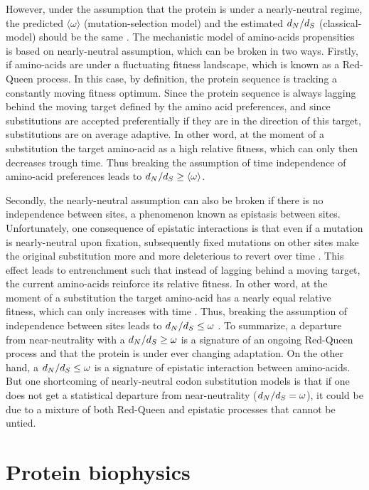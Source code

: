 However, under the assumption that the protein is under a nearly-neutral regime, the predicted $\langle \omega \rangle$ (mutation-selection model)  and the estimated $d_N / d_S$ (classical-model) should be the same \citep{Spielman2015, Spielman2016}.
The mechanistic model of amino-acids propensities is based on nearly-neutral assumption, which can be broken in two ways.
Firstly, if amino-acids are under a fluctuating fitness landscape, which is known as a Red-Queen process.
In this case, by definition, the protein sequence is tracking a constantly moving fitness optimum.
Since the protein sequence is always lagging behind the moving target defined by the amino acid preferences, and since substitutions are accepted preferentially if they are in the direction of this target, substitutions are on average adaptive.
In other word, at the moment of a substitution the target amino-acid as a high relative fitness, which can only then decreases trough time.
Thus breaking the assumption of time independence of amino-acid preferences leads to $d_N / d_S \geq \langle \omega \rangle$.

Secondly, the nearly-neutral assumption can also be broken if there is no independence between sites, a phenomenon known as epistasis between sites.
Unfortunately, one consequence of epistatic interactions is that even if a mutation is nearly-neutral upon fixation, subsequently fixed mutations on other sites make the original substitution more and more deleterious to revert over time \citep{Gong2014, Lunzer2010, Mccandlish2013}.
This effect leads to entrenchment such that instead of lagging behind a moving target, the current amino-acids reinforce its relative fitness.
In other word, at the moment of a substitution the target amino-acid has a nearly equal relative fitness, which can only increases with time \cite{Goldstein2016, Goldstein2017}.
Thus, breaking the assumption of independence between sites leads to $d_N / d_S \leq \omega$ \citep{Rodrigue2016}.
To summarize, a departure from near-neutrality with a $d_N / d_S \geq \omega$ is a signature of an ongoing Red-Queen process and that the protein is under ever changing adaptation.
On the other hand, a $d_N / d_S \leq \omega$ is a signature of epistatic interaction between amino-acids.
But one shortcoming of nearly-neutral codon substitution models is that if one does not get a statistical departure from near-neutrality ($d_N / d_S = \omega$), it could be due to a mixture of both Red-Queen and epistatic processes that cannot be untied.

\section{Protein biophysics}

